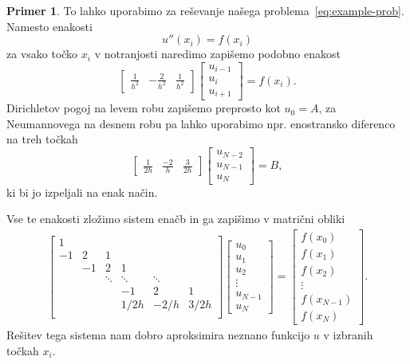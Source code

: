 \documentclass[12pt,a4paper]{article}
\theoremstyle{definition} %
\newtheorem{primer}[definicija]{Primer}
\theoremstyle{plain} %
\numberwithin{equation}{section}
\begin{document}
\begin{primer}
To lahko uporabimo za reševanje našega problema~\eqref{eq:example-prob}.
Namesto enakosti
\[ u''(x_i) = f(x_i) \]
za vsako točko $x_i$ v notranjosti naredimo zapišemo podobno enakost
\[
  \begin{bmatrix}
    \frac{1}{h^2} & -\frac{2}{h^2} & \frac{1}{h^2}
  \end{bmatrix}\begin{bmatrix}
    u_{i-1} \\ u_{i} \\ u_{i+1}
  \end{bmatrix} = f(x_i).
\]
Dirichletov pogoj na levem robu zapišemo preprosto kot $u_0 = A$,
za Neumannovega na desnem robu pa lahko uporabimo npr. enostransko diferenco
na treh točkah \[
  \begin{bmatrix}
    \frac{1}{2h} & \frac{-2}{h} & \frac{3}{2h}
  \end{bmatrix}\begin{bmatrix}
    u_{N-2} \\ u_{N-1} \\ u_{N}
  \end{bmatrix} = B,
\]
ki bi jo izpeljali na enak način.

Vse te enakosti zložimo sistem enačb in ga zapišimo v matrični obliki
\begin{align*}
  \begin{bmatrix}
    1 &  \\
    -1 & 2 & 1 \\
    & -1 & 2 & 1 \\
    & & \!\ddots & \!\ddots & \! \ddots \\
    &&& -1 & 2 & 1 \\
    &&& 1/2h & -2/h & 3/2h \\
  \end{bmatrix}
\begin{bmatrix}
  u_0 \\ u_1 \\ u_2 \\ \vdots \\ u_{N-1} \\ u_N
\end{bmatrix}
 =
 \begin{bmatrix}
   f(x_0) \\
   f(x_1) \\
   f(x_2) \\
   \vdots \\
   f(x_{N-1}) \\
   f(x_N)
 \end{bmatrix}.
\end{align*}
Rešitev tega sistema nam dobro aproksimira neznano funkcijo $u$ v izbranih
točkah $x_i$.
\end{primer}
\end{document}
